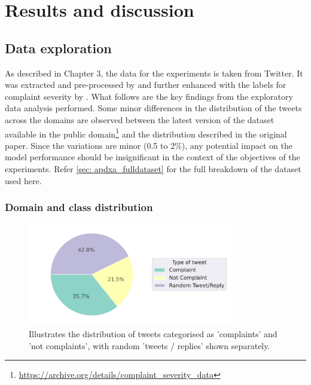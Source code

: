 \chapter{Results and discussion}

\section{Data exploration}
As described in Chapter 3, the data for the experiments is taken from Twitter. It was extracted and pre-processed by \cite{preotiuc-pietro_automatically_2019} and further enhanced with the labels for complaint severity by \cite{jinModelingSeverityComplaints2021}. What follows are the key findings from the exploratory data analysis performed. Some minor differences in the distribution of the tweets across the domains are observed between the latest version of the dataset available in the public domain\footnote{\url{https://archive.org/details/complaint_severity_data}} and the distribution described in the original paper. Since the variations are minor (0.5 to 2\%), any potential impact on the model performance should be insignificant in the context of the objectives of the experiments. Refer \ref{sec: apdxa_fulldataset} for the full breakdown of the dataset used here.

\subsection{Domain and class distribution}
\begin{figure}[htb]
    \centering
    \captionsetup{font=small}
    \includegraphics[width=9cm]{figures/compl_non_random_dist.pdf}
    \vspace*{-3mm}
    \caption{Illustrates the distribution of tweets categorised as 'complaints' and 'not complaints', with random 'tweets / replies' shown separately.}
    \label{fig: compl_non_random_dist}
\end{figure}


